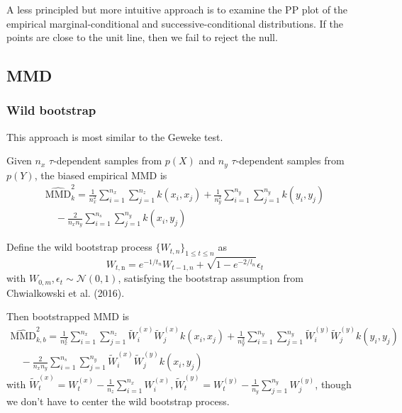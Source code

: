 \documentclass{article}
\begin{document}
A less principled but more intuitive approach is to examine the PP plot of the empirical marginal-conditional and successive-conditional distributions. If the points are close to the unit line, then we fail to reject the null.

\subsection{MMD}

\subsubsection{Wild bootstrap}
This approach is most similar to the Geweke test.

Given $n_{x}$ $\tau$-dependent samples from $p(X)$ and $n_{y}$ $\tau$-dependent samples from $p(Y)$, the biased empirical MMD is
\begin{equation}
\begin{array}{c}
\widehat{\mathrm{MMD}}^{2}_{k}=\frac{1}{n_{x}^{2}} \sum_{i=1}^{n_{x}} \sum_{j=1}^{n_{z}} k\left(x_{i}, x_{j}\right)+\frac{1}{n_{y}^{2}} \sum_{i=1}^{n_{y}} \sum_{j=1}^{n_{y}} k\left(y_{i}, y_{j}\right) \\
\quad-\frac{2}{n_{x} n_{y}} \sum_{i=1}^{n_{s}} \sum_{j=1}^{n_{y}} k\left(x_{i}, y_{j}\right)
\end{array}
\end{equation}

Define the wild bootstrap process $\{W_{t,n}\}_{1\leq t\leq n}$ as
\begin{equation}
W_{t, \mathrm{n}}=e^{-1 / t_{n}} W_{t-1, n}+\sqrt{1-e^{-2 / l_{n}}} \epsilon_{t}
\end{equation}
with $W_{0,m}, \epsilon_{t} \sim \mathcal{N}(0,1)$, satisfying the bootstrap assumption from Chwialkowski et al. (2016).

Then bootstrapped MMD is
\begin{equation}
\begin{array}{c}
\widehat{\mathrm{MMD}}^{2}_{k, b}=\frac{1}{n_{x}^{2}} \sum_{i=1}^{n_{x}} \sum_{j=1}^{n_{z}} \tilde{W}_{i}^{(x)} \tilde{W}_{j}^{(x)} k\left(x_{i}, x_{j}\right)+\frac{1}{n_{y}^{2}} \sum_{i=1}^{n_{y}} \sum_{j=1}^{n_{y}} \tilde{W}_{i}^{(y)} \tilde{W}_{j}^{(y)} k\left(y_{i}, y_{j}\right) \\
\quad-\frac{2}{n_{x} n_{y}} \sum_{i=1}^{n_{s}} \sum_{j=1}^{n_{y}} \tilde{W}_{i}^{(x)} \tilde{W}_{j}^{(y)} k\left(x_{i}, y_{j}\right)
\end{array}
\end{equation}
with $\tilde{W}_{t}^{(x)}=W_{t}^{(x)}-\frac{1}{n_{z}} \sum_{i=1}^{n_{x}} W_{i}^{(x)}, \tilde{W}_{t}^{(y)}=W_{t}^{(y)}-\frac{1}{n_{y}} \sum_{j=1}^{n_{y}} W_{j}^{(y)}$, though we don't have to center the wild bootstrap process.
\end{document}
